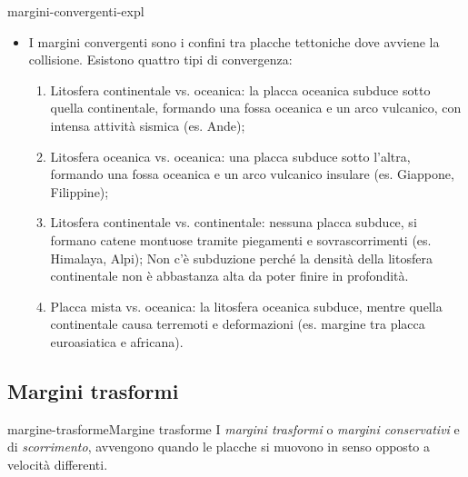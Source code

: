 \documentclass[preview]{standalone}
\begin{document}
\begin{snippet}{margini-convergenti-expl}
    \begin{itemize}
        \item I margini convergenti sono i confini tra placche tettoniche dove avviene la collisione.
            Esistono quattro tipi di convergenza:
            \begin{enumerate}
                \item Litosfera continentale vs. oceanica: la placca oceanica subduce sotto quella
                    continentale, formando una fossa oceanica e un arco vulcanico, con intensa
                    attività sismica (es. Ande);
                \item Litosfera oceanica vs. oceanica: una placca subduce sotto l'altra, formando
                    una fossa oceanica e un arco vulcanico insulare (es. Giappone, Filippine);
                \item Litosfera continentale vs. continentale: nessuna placca subduce, si formano
                    catene montuose tramite piegamenti e sovrascorrimenti (es. Himalaya, Alpi);
                    Non c'è subduzione perché la densità della litosfera continentale non è abbastanza
                    alta da poter finire in profondità.
                \item Placca mista vs. oceanica: la litosfera oceanica subduce, mentre quella
                    continentale causa terremoti e deformazioni (es. margine tra placca
                    euroasiatica e africana).
            \end{enumerate}
    \end{itemize}
\end{snippet}

\subsection{Margini trasformi}

\begin{snippetdefinition}{margine-trasforme}{Margine trasforme}
    I \textit{margini trasformi} o \textit{margini conservativi} e di \textit{scorrimento},
    avvengono quando le placche si muovono in senso opposto a velocità differenti.
\end{snippetdefinition}
\end{document}
